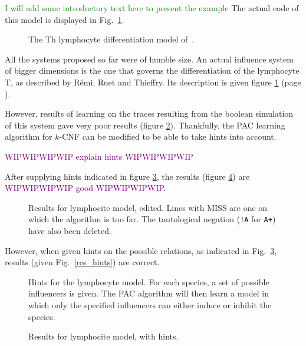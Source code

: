 \documentclass{llncs}
\newcommand{\wip}[1]{\textcolor{Purple}{WIPWIPWIPWIP #1 WIPWIPWIPWIP}}
\newcommand{\sylvain}[1]{\textcolor{green}{#1}}
\begin{document}
\begin{example}
   \sylvain{I will add some introductory text here to present the example}
   The actual code of this model is displayed in Fig.~\ref{lympho}.
\begin{figure}[htbp]
	
	\caption{The Th lymphocyte differentiation model of~\cite{RRMTC06tcsb}.\label{lympho}}
\end{figure}
\end{example}

All the systems proposed so far were of humble size. An actual influence system of bigger dimensions is the one that governs the differentiation of the lymphocyte T, as described by R\'{e}mi, Ruet and Thieffry\cite{RRMTC06tcsb}. Its description is given figure \ref{lympho} (page \pageref{lympho}).

However, results of learning on the traces resulting from the boolean simulation of this system gave very poor results (figure \ref{lympho_res}). Thankfully, the PAC learning algorithm for $k$-CNF can be modified to be able to take hints into account.

\wip{explain hints}

After supplying hints indicated in figure \ref{hints}, the results (figure \ref{hints.res}) are \wip{good}.
	
\begin{figure}
	
	\caption{Results for lymphocite model, edited. Lines with MISS are one on which the algorithm is too far. The tautological negation (\texttt{!A} for \texttt{A+}) have also been deleted.\label{lympho_res}}
\end{figure}

However, when given hints on the possible relations, as indicated in
Fig.~\ref{hints}, results (given Fig.~\ref{res_hints}) are correct.

\begin{figure}
	
	\caption{Hints for the lymphocyte model. For each species, a set of possible influencers is given. The PAC algorithm will then learn a model in which only the specified influencers can either induce or inhibit the species.\label{hints}}
\end{figure}
\begin{figure}
	
	\caption{Results for lymphocite model, with hints.\label{hints.res}}
\end{figure}
\end{document}
